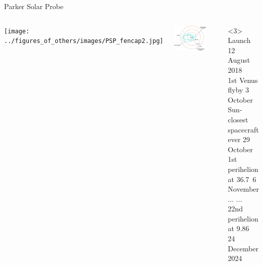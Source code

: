 \begin{frame}[plain,c]{Parker Solar Probe}{}
	\begin{columns}[c]
		
		\texttt{[image: ../figures\_of\_others/images/PSP\_fencap2.jpg]}


		\centering
		\vspace{-4mm}
		\includegraphics[width=0.75\textwidth]{../figures_of_others/images/PSP_MissionDesign2_negative_crop.png}
		\begin{block}<3>{}
			Launch	\hfill	12 August 2018\\
			1st Venus flyby	\hfill	3 October\\
			Sun-closest spacecraft ever	\hfill	29 October\\
			1st perihelion at 36.7\,\Rs{}	\hfill	6 November\\
			...	\hfill	...\\
			22nd perihelion at 9.86\,\Rs{}	\hfill	24 December 2024
		\end{block}
	\end{columns}
\end{frame}
